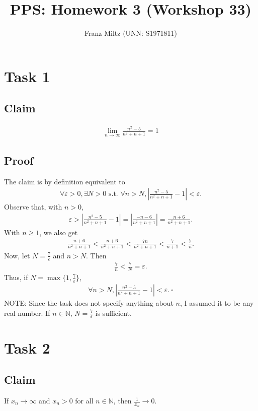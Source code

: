 \documentclass{article}
\title{PPS: Homework 3 (Workshop 33)}
\author{Franz Miltz (UNN: S1971811)}
\newcommand{\N}{\mathbb{N}}
\newcommand{\st}{\text{ s.t. }}
\begin{document}
\maketitle
\section*{Task 1}
\subsection*{Claim}
\begin{align*}
  \lim_{n\to\infty}\frac{n^2-5}{n^2+n+1}=1
\end{align*}
\subsection*{Proof}
The claim is by definition equivalent to
\begin{align*}
  \forall \varepsilon > 0, \exists N>0 \st \forall n>N, \left|\frac{n^2-5}{n^2+n+1}-1\right|<\varepsilon.
\end{align*}
Observe that, with $n>0$,
\begin{align*}
  \varepsilon > \left|\frac{n^2-5}{n^2+n+1}-1\right|
  =  \left|\frac{-n-6}{n^2+n+1}\right|
  =  \frac{n+6}{n^2+n+1}.
\end{align*}
With $n\geq 1$, we also get
\begin{align*}
  \frac{n+6}{n^2+n+1}<\frac{n+6}{n^2+n+1}<\frac{7n}{n^2+n+1}<\frac{7}{n+1}<\frac{7}{n}.
\end{align*}
Now, let $N=\frac{7}{\varepsilon}$ and $n>N$. Then
\begin{align*}
  \frac{7}{n}<\frac{7}{N}=\varepsilon.
\end{align*}
Thus, if $N = \max\{1, \frac{7}{\varepsilon}\}$,
\begin{align*}
  \forall n > N, \left|\frac{n^2-5}{n^2+n+1}-1\right|<\varepsilon.\:\square  
\end{align*}
NOTE: Since the task does not specify anything about $n$, I assumed it to be any real number. If $n\in\N$, $N=\frac{7}{\varepsilon}$ is sufficient.
\section*{Task 2}
\subsection*{Claim}
If $x_n\to\infty$ and $x_n>0$ for all $n\in\N$, then $\frac{1}{x_n}\to 0$.
\end{document}
